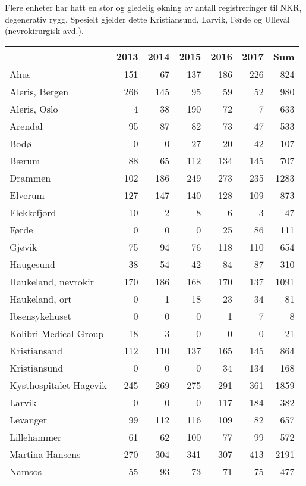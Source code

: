 \documentclass [norsk,a4paper,twoside]{article}\usepackage[]{graphicx}\usepackage[]{color}
\begin{document}
Flere enheter har hatt en stor og gledelig økning av antall registreringer til NKR, degenerativ rygg. Spesielt gjelder dette Kristiansund, Larvik, Førde og Ullevål (nevrokirurgisk avd.).
\begin{table}[ht]
\centering
\begin{tabular}{lrrrrrr}
  \hline
 & 2013 & 2014 & 2015 & 2016 & 2017 & Sum \\ 
  \hline
Ahus & 151 & 67 & 137 & 186 & 226 & 824 \\ 
  Aleris, Bergen & 266 & 145 & 95 & 59 & 52 & 980 \\ 
  Aleris, Oslo & 4 & 38 & 190 & 72 & 7 & 633 \\ 
  Arendal & 95 & 87 & 82 & 73 & 47 & 533 \\ 
  Bodø & 0 & 0 & 27 & 20 & 42 & 107 \\ 
  Bærum & 88 & 65 & 112 & 134 & 145 & 707 \\ 
  Drammen & 102 & 186 & 249 & 273 & 235 & 1283 \\ 
  Elverum & 127 & 147 & 140 & 128 & 109 & 873 \\ 
  Flekkefjord & 10 & 2 & 8 & 6 & 3 & 47 \\ 
  Førde & 0 & 0 & 0 & 25 & 86 & 111 \\ 
  Gjøvik & 75 & 94 & 76 & 118 & 110 & 654 \\ 
  Haugesund & 38 & 54 & 42 & 84 & 87 & 310 \\ 
  Haukeland, nevrokir & 170 & 186 & 168 & 170 & 137 & 1091 \\ 
  Haukeland, ort & 0 & 1 & 18 & 23 & 34 & 81 \\ 
  Ibsensykehuset & 0 & 0 & 0 & 1 & 7 & 8 \\ 
  Kolibri Medical Group & 18 & 3 & 0 & 0 & 0 & 21 \\ 
  Kristiansand & 112 & 110 & 137 & 165 & 145 & 864 \\ 
  Kristiansund & 0 & 0 & 0 & 34 & 134 & 168 \\ 
  Kysthospitalet Hagevik & 245 & 269 & 275 & 291 & 361 & 1859 \\ 
  Larvik & 0 & 0 & 0 & 117 & 184 & 382 \\ 
  Levanger & 99 & 112 & 116 & 109 & 82 & 657 \\ 
  Lillehammer & 61 & 62 & 100 & 77 & 99 & 572 \\ 
  Martina Hansens & 270 & 304 & 341 & 307 & 413 & 2191 \\ 
  Namsos & 55 & 93 & 73 & 71 & 75 & 477 \\ 

\end{tabular}
\end{table}
\end{document}
